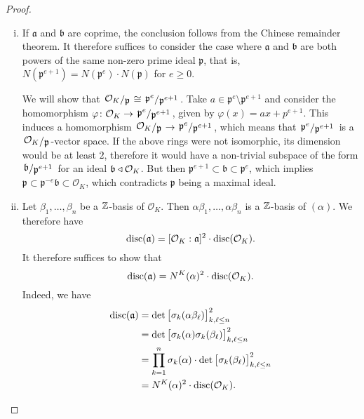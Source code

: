 \begin{proof}
\phantom{i}
\begin{enumerate}[i)]
\item If $\mathfrak{a}$ and $\mathfrak{b}$ are coprime, the
conclusion follows from the Chinese remainder theorem. It therefore
suffices to consider the case where $\mathfrak{a}$ and
$\mathfrak{b}$ are both powers of the same non-zero prime ideal
$\mathfrak{p}$, that is,
$N(\mathfrak{p}^{e+1}) = N(\mathfrak{p}^e) \cdot N(\mathfrak{p})$
for $e \geq 0$.

We will show that
$\kvoc{\mathcal{O}_K}{\mathfrak{p}} \cong
\kvoc{\mathfrak{p}^e}{\mathfrak{p}^{e+1}}$. Take
$a \in \mathfrak{p}^e \setminus \mathfrak{p}^{e+1}$ and consider
the homomorphism $\varphi \colon \mathcal{O}_K \to
\kvoc{\mathfrak{p}^e}{\mathfrak{p}^{e+1}}$, given by
$\varphi(x) = ax + p^{e+1}$. This induces a homomorphism
$\kvoc{\mathcal{O}_K}{\mathfrak{p}} \to
\kvoc{\mathfrak{p}^e}{\mathfrak{p}^{e+1}}$, which means that
$\kvoc{\mathfrak{p}^e}{\mathfrak{p}^{e+1}}$ is a
$\kvoc{\mathcal{O}_K}{\mathfrak{p}}$-vector space. If the above
rings were not isomorphic, its dimension would be at least $2$,
therefore it would have a non-trivial subspace of the form
$\kvoc{\mathfrak{b}}{\mathfrak{p}^{e+1}}$ for an ideal
$\mathfrak{b} \triangleleft \mathcal{O}_K$. But then
$\mathfrak{p}^{e+1} \subset \mathfrak{b} \subset \mathfrak{p}^e$,
which implies
$\mathfrak{p} \subset
\mathfrak{p}^{-e} \mathfrak{b} \subset
\mathcal{O}_K$,
which contradicts $\mathfrak{p}$ being a maximal ideal.
\item Let $\beta_1, \dots, \beta_n$ be a $\mathbb{Z}$-basis of
$\mathcal{O}_K$. Then $\alpha \beta_1, \dots, \alpha \beta_n$ is a
$\mathbb{Z}$-basis of $(\alpha)$. We therefore have
\[
\operatorname{disc}(\mathfrak{a}) =
[\mathcal{O}_K : \mathfrak{a}]^2 \cdot \operatorname{disc}(\mathcal{O}_K).
\]
It therefore suffices to show that
\[
\operatorname{disc}(\mathfrak{a}) =
N^K(\alpha)^2 \cdot \operatorname{disc}(\mathcal{O}_K).
\]
Indeed, we have
\begin{align*}
\operatorname{disc}(\mathfrak{a}) &=
\det \begin{bmatrix}
\sigma_k(\alpha \beta_\ell)
\end{bmatrix}_{k, \ell \leq n}^2
\\
&=
\det \begin{bmatrix}
\sigma_k(\alpha) \sigma_k(\beta_\ell)
\end{bmatrix}_{k, \ell \leq n}^2
\\
&=
\prod_{k=1}^n \sigma_k(\alpha) \cdot
\det \begin{bmatrix}
\sigma_k(\beta_\ell)
\end{bmatrix}_{k, \ell \leq n}^2
\\
&=
N^K(\alpha)^2 \cdot \operatorname{disc}(\mathcal{O}_K). \qedhere
\end{align*}
\end{enumerate}
\end{proof}


